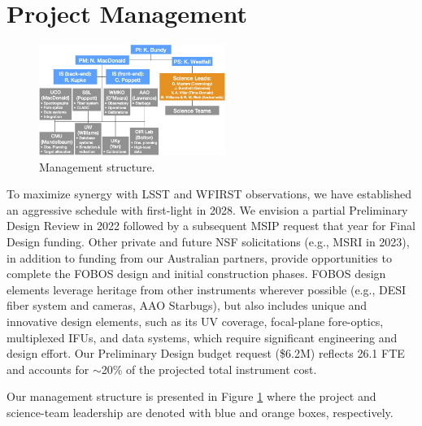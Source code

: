 \documentclass[oneside,11pt]{amsart}
\begin{document}

\section{Project Management}
\label{sec:mng}


\begin{figure}%
\includegraphics[width=0.54\textwidth]{figs/org_chart_v5.png}
\caption{Management structure.}
\label{fig:org}
\end{figure}

To maximize synergy with LSST and WFIRST observations, we have established an aggressive schedule with first-light in 2028.  We envision a partial Preliminary Design Review in 2022 followed by a subsequent MSIP request that year for Final Design funding. Other private and future NSF solicitations (e.g., MSRI in 2023), in addition to funding from our Australian partners, provide opportunities to complete the FOBOS design and initial construction phases.  FOBOS design elements leverage heritage from other instruments wherever possible (e.g., DESI fiber system and cameras, AAO Starbugs), but also includes unique and innovative design elements, such as its UV coverage, focal-plane fore-optics, multiplexed IFUs, and data systems, which require significant engineering and design effort.  Our Preliminary Design budget request (\$6.2M) reflects 26.1 FTE and accounts for $\sim$20\% of the projected total instrument cost.


Our management structure is presented in Figure \ref{fig:org} where the  project and science-team leadership are denoted with blue and orange boxes, respectively.  
\end{document}
